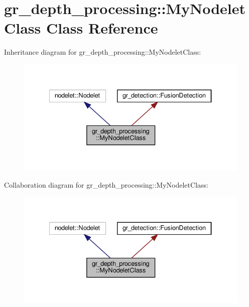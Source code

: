\hypertarget{classgr__depth__processing_1_1MyNodeletClass}{}\section{gr\+\_\+depth\+\_\+processing\+:\+:My\+Nodelet\+Class Class Reference}
\label{classgr__depth__processing_1_1MyNodeletClass}


Inheritance diagram for gr\+\_\+depth\+\_\+processing\+:\+:My\+Nodelet\+Class\+:
\nopagebreak
\begin{figure}[H]
\begin{center}
\leavevmode
\includegraphics[width=334pt]{classgr__depth__processing_1_1MyNodeletClass__inherit__graph}
\end{center}
\end{figure}


Collaboration diagram for gr\+\_\+depth\+\_\+processing\+:\+:My\+Nodelet\+Class\+:
\nopagebreak
\begin{figure}[H]
\begin{center}
\leavevmode
\includegraphics[width=334pt]{classgr__depth__processing_1_1MyNodeletClass__coll__graph}
\end{center}
\end{figure}
